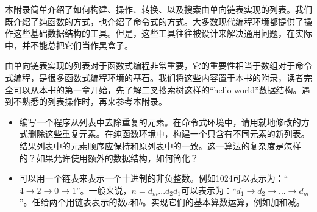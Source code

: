 \documentclass[b5paper]{ctexart}
\begin{document}
本附录简单介绍了如何构建、操作、转换、以及搜索由单向链表实现的列表。我们既介绍了纯函数的方式，也介绍了命令式的方式。大多数现代编程环境都提供了操作这些基础数据结构的工具。但是，这些工具往往被设计来解决通用问题，在实际中，并不能总把它们当作黑盒子。

由单向链表实现的列表对于函数式编程非常重要，它的重要性相当于数组对于命令式编程，是很多函数式编程环境的基石。我们将这些内容置于本书的附录，读者完全可以从本书的第一章开始，先了解二叉搜索树这样的“hello world”数据结构。遇到不熟悉的列表操作时，再来参考本附录。

\begin{Exercise}
\begin{itemize}
\item 编写一个程序从列表中去除重复的元素。在命令式环境中，请用就地修改的方式删除这些重复元素。在纯函数环境中，构建一个只含有不同元素的新列表。结果列表中的元素顺序应保持和原列表中的一致。这一算法的复杂度是怎样的？如果允许使用额外的数据结构，如何简化？
\item 可以用一个链表来表示一个十进制的非负整数。例如1024可以表示为：“$4 \rightarrow 2 \rightarrow 0 \rightarrow 1$”。一般来说，$n = d_m...d_2d_1$可以表示为：“$d_1 \rightarrow d_2 \rightarrow ... \rightarrow d_m$”。任给两个用链表表示的数$a$和$b$。实现它们的基本算数运算，例如加和减。
\end{itemize}
\end{Exercise}

\end{document}
